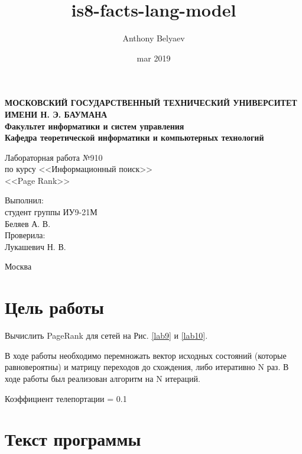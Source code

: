 \documentclass[12pt]{article}
\title{is8-facts-lang-model}
\date{mar 2019}
\author{Anthony Belyaev}
\begin{document}
    \newpage
    {
        \thispagestyle{empty}
        \centering
        
        \textbf{
        МОСКОВСКИЙ ГОСУДАРСТВЕННЫЙ ТЕХНИЧЕСКИЙ УНИВЕРСИТЕТ ИМЕНИ Н. Э. БАУМАНА \\
        Факультет информатики и систем управления \\
        Кафедра теоретической информатики и компьютерных технологий}
        \bigskip
        \bigskip
        \bigskip
        \bigskip
        \bigskip
        \bigskip
        \vfill

        {\large Лабораторная работа №910}\\
        по курсу <<Информационный поиск>>\\
	\LARGE{<<Page Rank>> }
	\normalsize

        \bigskip
        \vfill
        \hfill\parbox{5cm} {
            Выполнил:\\
            студент группы ИУ9-21М \hfill \\
            Беляев А. В.\hfill \medskip\\
            Проверила:\\
            Лукашевич Н. В.\hfill
        }
        \vspace{\fill}

        
        Москва \number\year
        \clearpage
    }
	\newpage
	
    {
        \section{Цель работы}
    }
	
    Вычислить PageRank для сетей на Рис. \ref{lab9} и \ref{lab10}.

    В ходе работы необходимо перемножать вектор исходных состояний (которые равновероятны) и матрицу переходов до схождения, либо итеративно N раз. В ходе работы был реализован алгоритм на N итераций.
    
    Коэффициент телепортации = 0.1
   
   
   {
        \section{Текст программы}
    }
    
\end{document}
